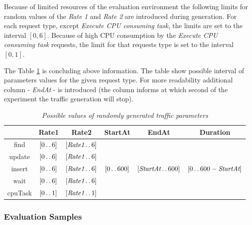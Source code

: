 \documentclass[12pt,a4paper]{article}
\begin{document}
Because of limited resources of the evaluation environment the following limits for random values of the \textit{Rate 1} and \textit{Rate 2} are introduced during generation.  For each request type, except \textit{Execute CPU consuming task}, the limits are set to the interval $[0,6]$. Because of high CPU consumption by the \textit{Execute CPU consuming task} requests, the limit for that requests type is set to the interval $[0,1]$. 

The Table \ref{table:random:traffic:possiblevalues} is concluding above information. The table show possible interval of parameters values for the given request type. For more readability additional column - \textit{EndAt} - is introduced (the column informs at which second of the experiment the traffic generation will stop). 

\newcommand{\twodots}{\mathinner {\ldotp \ldotp}}

\begin{table}[ht]
\begin{center}
\begin{tabular}{c|c|c|c|c|c}
        & Rate1 & Rate2 & StartAt & EndAt & Duration \\\hline
find	&$[0 \twodots 6]$    &$[\textit{Rate1} \twodots 6]$    &\multirow{5}{*}{$[0 \twodots 600]$}&\multirow{5}{*}{$[\textit{StartAt} \twodots 600]$}&\multirow{5}{*}{$[0 \twodots 600 -\textit{StartAt}]$}\\ \cline{1-3}
update	&$[0 \twodots 6]$    &$[\textit{Rate1} \twodots 6]$	  &	                     & 	                    \\ \cline{1-3}
insert	&$[0 \twodots 6]$    &$[\textit{Rate1} \twodots 6]$	  &	                     &                      \\ \cline{1-3}
wait	&$[0 \twodots 6]$    &$[\textit{Rate1} \twodots 6]$	  &	                     &                      \\ \cline{1-3}
cpuTask	&$[0 \twodots 1]$     &$[\textit{Rate1} \twodots 1]$     &	                     & 	                    \\  
\end{tabular}
\end{center}
\caption{\textit{Possible values of randomly generated traffic parameters}} \label{table:random:traffic:possiblevalues}
\end{table}


\subsubsection{Evaluation Samples}
\end{document}
